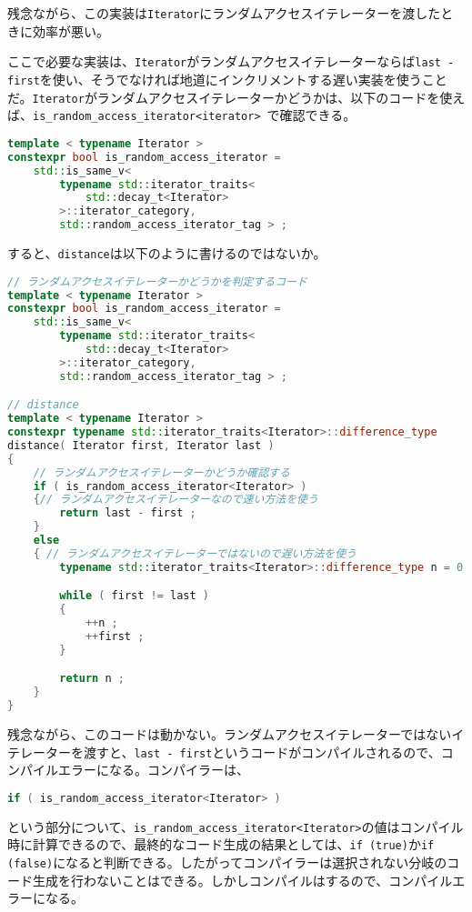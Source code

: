 残念ながら、この実装は\lstinline!Iterator!にランダムアクセスイテレーターを渡したときに効率が悪い。

ここで必要な実装は、\lstinline!Iterator!がランダムアクセスイテレーターならば\lstinline!last - first!を使い、そうでなければ地道にインクリメントする遅い実装を使うことだ。\lstinline!Iterator!がランダムアクセスイテレーターかどうかは、以下のコードを使えば、\lstinline!is_random_access_iterator<iterator>!~で確認できる。

\begin{lstlisting}[language=C++]
template < typename Iterator >
constexpr bool is_random_access_iterator =
    std::is_same_v<
        typename std::iterator_traits< 
            std::decay_t<Iterator> 
        >::iterator_category,
        std::random_access_iterator_tag > ;
\end{lstlisting}

すると、\lstinline!distance!は以下のように書けるのではないか。

\begin{lstlisting}[language=C++]
// ランダムアクセスイテレーターかどうかを判定するコード
template < typename Iterator >
constexpr bool is_random_access_iterator =
    std::is_same_v<
        typename std::iterator_traits< 
            std::decay_t<Iterator>
        >::iterator_category,
        std::random_access_iterator_tag > ;

// distance
template < typename Iterator >
constexpr typename std::iterator_traits<Iterator>::difference_type
distance( Iterator first, Iterator last )
{
    // ランダムアクセスイテレーターかどうか確認する
    if ( is_random_access_iterator<Iterator> )
    {// ランダムアクセスイテレーターなので速い方法を使う
        return last - first ;
    }
    else
    { // ランダムアクセスイテレーターではないので遅い方法を使う
        typename std::iterator_traits<Iterator>::difference_type n = 0 ;

        while ( first != last )
        {
            ++n ;
            ++first ;
        }

        return n ;
    }
}
\end{lstlisting}

残念ながら、このコードは動かない。ランダムアクセスイテレーターではないイテレーターを渡すと、\lstinline!last - first!というコードがコンパイルされるので、コンパイルエラーになる。コンパイラーは、
\begin{lstlisting}[language=C++]
if ( is_random_access_iterator<Iterator> )
\end{lstlisting}
という部分について、\lstinline!is_random_access_iterator<Iterator>!の値はコンパイル時に計算できるので、最終的なコード生成の結果としては、\lstinline!if (true)!か\lstinline!if (false)!になると判断できる。したがってコンパイラーは選択されない分岐のコード生成を行わないことはできる。しかしコンパイルはするので、コンパイルエラーになる。


